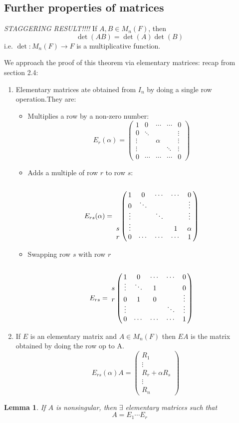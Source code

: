 \documentclass{report}
\newtheorem{lemma}[theorem]{Lemma}
\theoremstyle{remark}
\theoremstyle{definition}
\theoremstyle{definition}
\theoremstyle{theorem}
\begin{document}
\subsection{Further properties of matrices}
\emph{STAGGERING RESULT!!!!}
If $A, B \in M_n(F)$, then
\[\det(AB)=\det(A)\det(B)\]
i.e. $\det : M_n(F) \rightarrow F$ is a multiplicative function.\par
We approach the proof of this theorem via elementary matrices: recap from section 2.4:
\begin{enumerate}
    \item Elementary matrices ate obtained from $I_n$ by doing a single row operation.They are:
    \begin{itemize}
    \item Multiplies a row by a non-zero number:
    \[ E_r(\alpha) = \begin{pmatrix}
    1&0&\cdots&\cdots&0\\
    0&\ddots&&&\vdots\\
    \vdots&&\alpha&&\vdots\\
    \vdots&&&\ddots&\vdots\\
    0&\cdots&\cdots&\cdots&0
    \end{pmatrix} \]
    \item Adds a multiple of row $r$ to row $s$:
    \[ E_{rs}(\alpha) = \bordermatrix{
    &&&&&\cr
    &1&0&\cdots&\cdots&0\cr
    &0&\ddots&&&\vdots\cr
    &\vdots&&\ddots&&\vdots\cr
    s&\vdots&&&1&\alpha\cr
    r&0&\cdots&\cdots&\cdots&1\cr} 
    \]
    \item Swapping row $s$ with row $r$
    \[
    E_{rs} = \bordermatrix{
    &&&&&\cr
    &1&0&\cdots&\cdots&0\cr
    s&\vdots&\ddots&1&&0\cr
    r&0&1&0&&\vdots\cr
    &\vdots&&&\ddots&\vdots\cr
    &0&\cdots&\cdots&\cdots&1\cr
    }
    \]
    \end{itemize}
    \item If $E$ is an elementary matrix and $A \in M_n(F)$ then $EA$ is the matrix obtained by doing the row op to A. 
    \[E_{rs}(\alpha)A = \begin{pmatrix}
    R_1\\
    \vdots\\
    R_r + \alpha R_s\\
    \vdots\\
    R_n
    \end{pmatrix}\]
\end{enumerate}
\setcounter{theorem}{-1}
\begin{lemma}
If $A$ is nonsingular, then $\exists$ elementary matrices such that
\[A = E_1 \cdots E_r\]
\end{lemma}
\end{document}
